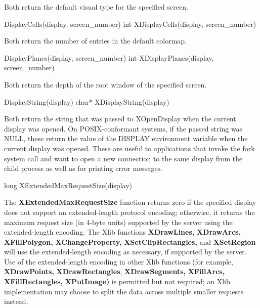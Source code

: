 \documentclass{report}
\begin{document}
\begin{itemize}
            \bigbreak \noindent 
            Both return the default visual type for the specified screen.
            \bigbreak \noindent 
            \begin{cppcode}
            DisplayCells(display, screen_number)
            int XDisplayCells(display, screen_number)
            \end{cppcode}
            \bigbreak \noindent 
            Both return the number of entries in the default colormap.
            \bigbreak \noindent 
            \begin{cppcode}
            DisplayPlanes(display, screen_number)
            int XDisplayPlanes(display, screen_number)
            \end{cppcode}
            \bigbreak \noindent 
            Both return the depth of the root window of the specified screen.
            \bigbreak \noindent 
            \begin{cppcode}
            DisplayString(display)
            char* XDisplayString(display)
            \end{cppcode}
            \bigbreak \noindent 
            Both return the string that was passed to XOpenDisplay when the current display was opened. On POSIX-conformant systems, if the passed string was NULL, these return the value of the DISPLAY environment variable when the current display was opened. These are useful to applications that invoke the fork system call and want to open a new connection to the same display from the child process as well as for printing error messages.
            \bigbreak \noindent 
            \begin{cppcode}
            long XExtendedMaxRequestSize(display)
            \end{cppcode}
            \bigbreak \noindent 
            The \textbf{XExtendedMaxRequestSize} function returns zero if the specified display does not support an extended-length protocol encoding; otherwise, it returns the maximum request size (in 4-byte units) supported by the server using the extended-length encoding. The Xlib functions \textbf{XDrawLines,} \textbf{XDrawArcs,} \textbf{XFillPolygon,} \textbf{XChangeProperty,} \textbf{XSetClipRectangles,} and \textbf{XSetRegion} will use the extended-length encoding as necessary, if supported by the server. Use of the extended-length encoding in other Xlib functions (for example, \textbf{XDrawPoints,} \textbf{XDrawRectangles}, \textbf{XDrawSegments,} \textbf{XFillArcs,} \textbf{XFillRectangles,} \textbf{XPutImage)} is permitted but not required; an Xlib implementation may choose to split the data across multiple smaller requests instead.

\end{itemize}
\end{document}
